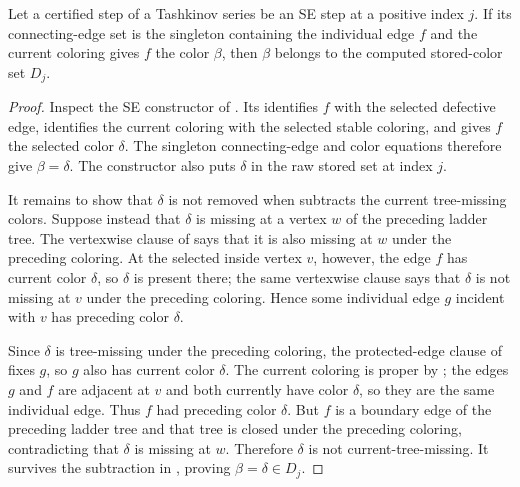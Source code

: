 \begin{lemma}
Let a certified step of a Tashkinov series be an SE step at a positive
index $j$.  If its connecting-edge set is the singleton containing the
individual edge $f$ and the current coloring gives $f$ the color
$\beta$, then $\beta$ belongs to the computed stored-color set $D_j$.
\end{lemma}
\begin{proof}
Inspect the SE constructor of .  Its
 identifies $f$ with the selected
defective edge, identifies the current coloring with the selected stable
coloring, and gives $f$ the selected color $\delta$.  The singleton
connecting-edge and color equations therefore give $\beta=\delta$.
The constructor also puts $\delta$ in the raw stored set at index $j$.

It remains to show that $\delta$ is not removed when
 subtracts the current tree-missing
colors.  Suppose instead that $δ$ is missing at a vertex $w$ of the
preceding ladder tree.  The vertexwise clause of
 says that it is also missing at $w$ under the
preceding coloring.  At the selected inside vertex $v$, however, the
edge $f$ has current color $\delta$, so $\delta$ is present there; the
same vertexwise clause says that $\delta$ is not missing at $v$ under
the preceding coloring.  Hence some individual edge $g$ incident with
$v$ has preceding color $\delta$.

Since $\delta$ is tree-missing under the preceding coloring, the
protected-edge clause of  fixes $g$, so $g$ also
has current color $\delta$.  The current coloring is proper by
; the edges $g$ and $f$ are adjacent at
$v$ and both currently have color $\delta$, so they are the same
individual edge.  Thus $f$ had preceding color $\delta$.  But $f$ is a
boundary edge of the preceding ladder tree and that tree is closed under
the preceding coloring, contradicting that $\delta$ is missing at $w$.
Therefore $\delta$ is not current-tree-missing.  It survives the
subtraction in , proving
$\beta=\delta\in D_j$.
\end{proof}

